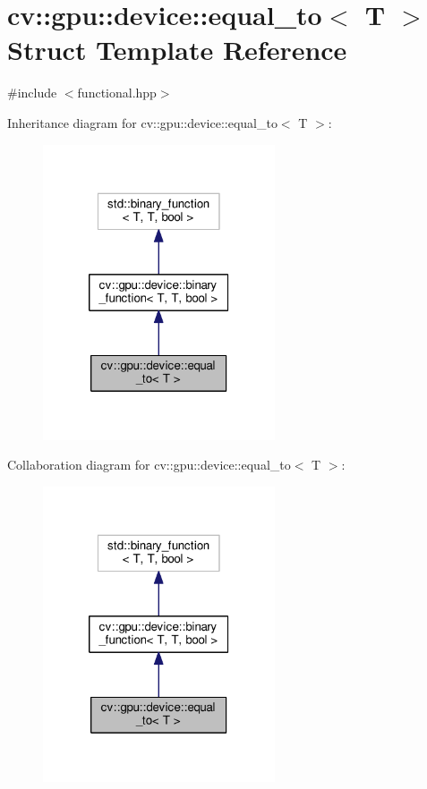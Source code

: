 \hypertarget{structcv_1_1gpu_1_1device_1_1equal__to}{\section{cv\-:\-:gpu\-:\-:device\-:\-:equal\-\_\-to$<$ T $>$ Struct Template Reference}
\label{structcv_1_1gpu_1_1device_1_1equal__to}
}


{\ttfamily \#include $<$functional.\-hpp$>$}



Inheritance diagram for cv\-:\-:gpu\-:\-:device\-:\-:equal\-\_\-to$<$ T $>$\-:\nopagebreak
\begin{figure}[H]
\begin{center}
\leavevmode
\includegraphics[width=194pt]{structcv_1_1gpu_1_1device_1_1equal__to__inherit__graph}
\end{center}
\end{figure}


Collaboration diagram for cv\-:\-:gpu\-:\-:device\-:\-:equal\-\_\-to$<$ T $>$\-:\nopagebreak
\begin{figure}[H]
\begin{center}
\leavevmode
\includegraphics[width=194pt]{structcv_1_1gpu_1_1device_1_1equal__to__coll__graph}
\end{center}
\end{figure}
